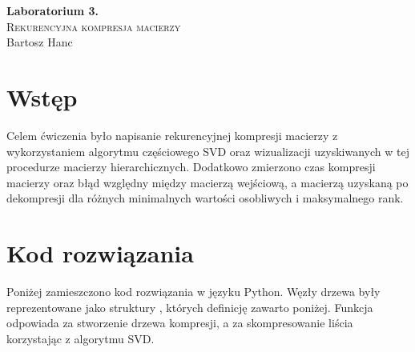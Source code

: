 \documentclass{../myclass}
\begin{document}
\begin{center}
    \Large \textbf{Laboratorium 3.}\\
    \large
    \textsc{Rekurencyjna kompresja macierzy}\\
    \normalsize
    Bartosz Hanc
\end{center}

\section{Wstęp}

Celem ćwiczenia było napisanie rekurencyjnej kompresji macierzy z wykorzystaniem algorytmu
częściowego SVD oraz wizualizacji uzyskiwanych w tej procedurze macierzy hierarchicznych. Dodatkowo
zmierzono czas kompresji macierzy oraz błąd względny między macierzą wejściową, a macierzą uzyskaną
po dekompresji dla różnych minimalnych wartości osobliwych i maksymalnego rank.

\section{Kod rozwiązania}

Poniżej zamieszczono kod rozwiązania w języku Python. Węzły drzewa były reprezentowane jako
struktury , których definicję zawarto poniżej. Funkcja
 odpowiada za stworzenie drzewa kompresji, a
 za skompresowanie liścia korzystając z algorytmu SVD.
\end{document}
